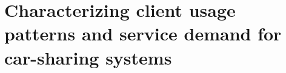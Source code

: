 
\chapter{Characterizing client usage patterns and service demand for car-sharing systems}
\label{chap:4_cs_comparison}
	\graphicspath{{Chapter4/}}















